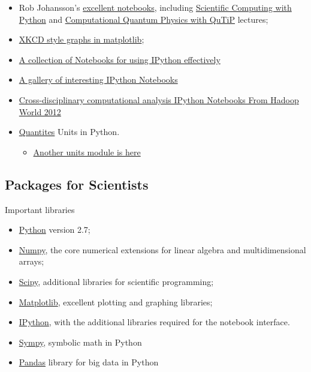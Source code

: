 \documentclass[11pt]{article}
\providecommand{\tightlist}{%
      \setlength{\itemsep}{0pt}\setlength{\parskip}{0pt}}
\begin{document}
\begin{itemize}
\tightlist
\item
  Rob Johansson's \href{http://jrjohansson.github.io/}{excellent
  notebooks}, including
  \href{https://github.com/jrjohansson/scientific-python-lectures}{Scientific
  Computing with Python} and
  \href{https://github.com/jrjohansson/qutip-lectures}{Computational
  Quantum Physics with QuTiP} lectures;
\item
  \href{http://nbviewer.ipython.org/url/jakevdp.github.com/downloads/notebooks/XKCD_plots.ipynb}{XKCD
  style graphs in matplotlib};
\item
  \href{https://github.com/ipython/ipython/tree/master/examples/notebooks\#a-collection-of-notebooks-for-using-ipython-effectively}{A
  collection of Notebooks for using IPython effectively}
\item
  \href{https://github.com/ipython/ipython/wiki/A-gallery-of-interesting-IPython-Notebooks}{A
  gallery of interesting IPython Notebooks}
\item
  \href{https://github.com/invisibleroads/crosscompute-tutorials}{Cross-disciplinary
  computational analysis IPython Notebooks From Hadoop World 2012}
\item
  \href{http://nbviewer.ipython.org/urls/raw.github.com/tbekolay/pyconca2012/master/QuantitiesTutorial.ipynb}{Quantites}
  Units in Python.

  \begin{itemize}
  \tightlist
  \item
    \href{http://www.southampton.ac.uk/~fangohr/blog/}{Another units
    module is here}
  \end{itemize}
\end{itemize}

\subsection{Packages for Scientists}\label{packages-for-scientists}

Important libraries

\begin{itemize}
\tightlist
\item
  \href{http://www.python.org}{Python} version 2.7;
\item
  \href{http://www.numpy.org}{Numpy}, the core numerical extensions for
  linear algebra and multidimensional arrays;
\item
  \href{http://www.scipy.org}{Scipy}, additional libraries for
  scientific programming;
\item
  \href{http://matplotlib.sf.net}{Matplotlib}, excellent plotting and
  graphing libraries;
\item
  \href{http://ipython.org}{IPython}, with the additional libraries
  required for the notebook interface.
\item
  \href{http://sympy.org}{Sympy}, symbolic math in Python
\item
  \href{http://pandas.pydata.org/}{Pandas} library for big data in
  Python
\end{itemize}
\end{document}
